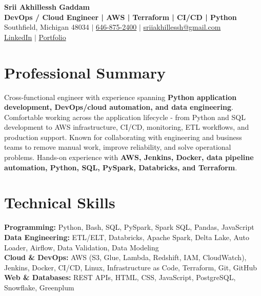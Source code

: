 \documentclass[letterpaper,10pt]{article}
\begin{document}
\fontsize{9.35pt}{10.45pt}\selectfont

\begin{center}
    {\LARGE \textbf{Srii Akhillessh Gaddam}} \\[-1pt]
    \textbf{DevOps / Cloud Engineer | AWS | Terraform | CI/CD | Python} \\[2pt]
    Southfield, Michigan 48034 $|$
    \href{tel:6468752400}{646-875-2400} $|$
    \href{mailto:sriiakhillessh@gmail.com}{sriiakhillessh@gmail.com} \\[1pt]
    \href{https://www.linkedin.com/in/srii-akhiilessh-gaddam-b48668191/}{LinkedIn} $|$
    \href{https://sriiakhillesshg.github.io/portfolio/}{Portfolio}
\end{center}
\vspace{-8pt}

\section{Professional Summary}
\small{Cross-functional engineer with experience spanning \textbf{Python application development, DevOps/cloud automation, and data engineering}. Comfortable working across the application lifecycle - from Python and SQL development to AWS infrastructure, CI/CD, monitoring, ETL workflows, and production support. Known for collaborating with engineering and business teams to remove manual work, improve reliability, and solve operational problems. Hands-on experience with \textbf{AWS, Jenkins, Docker, data pipeline automation, Python, SQL, PySpark, Databricks, and Terraform}.}

\section{Technical Skills}
\small{
\textbf{Programming:} Python, Bash, SQL, PySpark, Spark SQL, Pandas, JavaScript \\
\textbf{Data Engineering:} ETL/ELT, Databricks, Apache Spark, Delta Lake, Auto Loader, Airflow, Data Validation, Data Modeling \\
\textbf{Cloud \& DevOps:} AWS (S3, Glue, Lambda, Redshift, IAM, CloudWatch), Jenkins, Docker, CI/CD, Linux, Infrastructure as Code, Terraform, Git, GitHub \\
\textbf{Web \& Databases:} REST APIs, HTML, CSS, JavaScript, PostgreSQL, Snowflake, Greenplum
}
\end{document}
